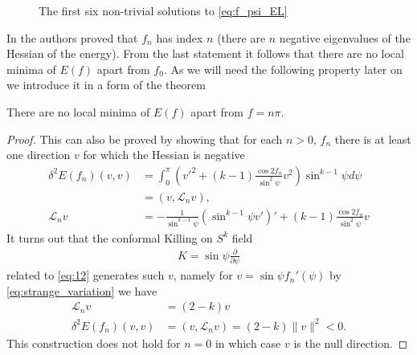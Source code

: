\begin{figure}[ht]
  \centering
  \label{fig:Harmonic_maps}
  
  \caption{The first six non-trivial solutions to \eqref{eq:f_psi_EL}}
\end{figure}

In \cite{Corlette2001} the authors proved that $f_n$ has index $n$
(there are $n$ negative eigenvalues of the Hessian of the
energy). From the last statement it follows that there are no local
minima of $E(f)$ apart from $f_0$. As we will need the following
property later on we introduce it in a form of the theorem
\begin{theorem}
  \label{thm:harmonic-map-index}
  There are no local minima of $E(f)$ apart from $f=n\pi$.
\end{theorem}
\begin{proof}
  This can also be proved by showing that for each $n>0$, $f_n$ there
  is at least one direction $v$ for which the Hessian is negative
  \begin{align}\label{eq:29}
    \delta^2E(f_n)(v,v) &=\int_0^{\pi} \left(
      v'^2+(k-1)\frac{\cos2f_n}{\sin^2\psi}v^2 \right)\sin^{k-1}\psi
    d\psi\\
    &=(v,\mathcal{L}_n v),\\
    \mathcal{L}_nv&=-\frac{1}{\sin^{k-1}\psi}\left(\sin^{k-1}\psi
      v'\right)'+(k-1)\frac{\cos2f_n}{\sin^2\psi}v
  \end{align}
  It turns out that the conformal Killing on $S^k$
  field
  \begin{align}
    \label{eq:30}
    K=\sin\psi\frac{\partial}{\partial\psi}
  \end{align}
  related to \eqref{eq:12} generates such $v$, namely for $v=\sin\psi
  f_n'(\psi)$ by \eqref{eq:strange_variation} we have
  \begin{align}
    \label{eq:31}
    \mathcal{L}_n v&=(2-k)v\\
    \delta^2 E(f_n)(v,v)&=(v,\mathcal{L}_n v)=(2-k)\lVert v\rVert^2<0.
  \end{align}
  This construction does not hold for $n=0$ in which case $v$ is the
  null direction.
\end{proof}

